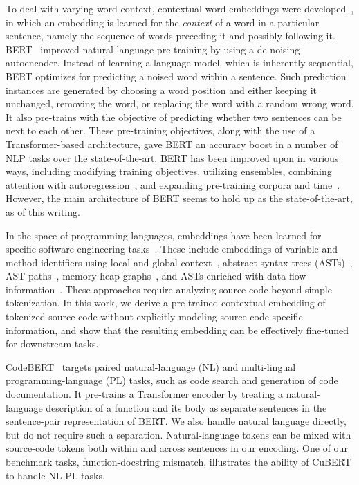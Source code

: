 \documentclass{article}
\newcommand{\BERTforCode}{CuBERT\xspace}
\begin{document}
To deal with varying word context, contextual word embeddings were developed~\citep{NIPS2017_7209,peters2018deep,GPT,radford2019language}, in which an embedding is learned for the \emph{context} of a word in a particular sentence, namely the sequence of words preceding it and possibly following it.
BERT~\citep{devlin-etal-2019-bert} improved natural-language pre-training by using a de-noising autoencoder. Instead of learning a language model, which is inherently sequential, BERT optimizes for predicting a noised word within a sentence. Such prediction instances are generated by choosing a word position and either keeping it unchanged, removing the word, or replacing the word with a random wrong word. It also pre-trains with the objective of predicting whether two sentences can be next to each other. These pre-training objectives, along with the use of a Transformer-based architecture, gave BERT an accuracy boost in a number of NLP tasks over the state-of-the-art. BERT has been improved upon in various ways, including modifying training objectives, utilizing ensembles, combining attention with autoregression~\citep{DBLP:journals/corr/abs-1906-08237}, and expanding pre-training corpora and time~\citep{DBLP:journals/corr/abs-1907-11692}. However, the main architecture of BERT seems to hold up as the state-of-the-art, as of this writing.



In the space of programming languages, embeddings have been learned for specific software-engineering tasks~\citep{chen2019literature}. These include embeddings of variable and method identifiers using local and global context~\citep{Allamanis:2015:SAM:2786805.2786849}, abstract syntax trees (ASTs)~\citep{Mou:2016:CNN:3015812.3016002,zhang2019novel}, AST paths~\citep{Alon:2019:CLD:3302515.3290353}, memory heap graphs~\citep{DBLP:journals/corr/LiTBZ15}, and ASTs enriched with data-flow information~\citep{graphsiclr2018,hellendoorn2020global}. These approaches require analyzing source code beyond simple tokenization. In this work, we derive a pre-trained contextual embedding of tokenized source code without explicitly modeling source-code-specific information, and show that the resulting embedding can be effectively fine-tuned for downstream tasks.

CodeBERT~\citep{feng2020codebert} targets paired natural-language (NL) and multi-lingual programming-language (PL) tasks, such as code search and generation of code documentation. It pre-trains a Transformer encoder by treating a natural-language description of a function and its body as separate sentences in the sentence-pair representation of BERT. We also handle natural language directly, but do not require such a separation. Natural-language tokens can be mixed with source-code tokens both within and across sentences in our encoding. One of our benchmark tasks, function-docstring mismatch, illustrates the ability of \BERTforCode to handle NL-PL tasks.
\end{document}

